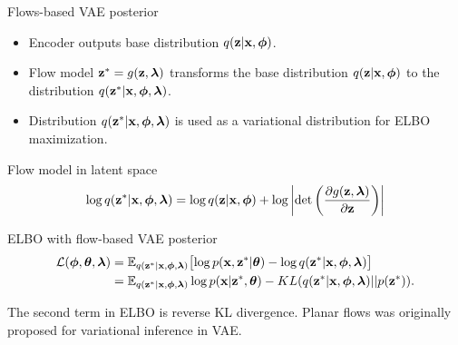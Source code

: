 \begin{frame}{Flows-based VAE posterior}
	\begin{itemize}
		\item Encoder outputs base distribution $q(\mathbf{z} | \mathbf{x}, \boldsymbol{\phi})$.
		\item Flow model $\mathbf{z}^* = g(\mathbf{z}, \boldsymbol{\lambda})$ transforms the base distribution $q(\mathbf{z} | \mathbf{x}, \boldsymbol{\phi})$ to the distribution $q(\mathbf{z}^* | \mathbf{x}, \boldsymbol{\phi}, \boldsymbol{\lambda})$.
		\item Distribution $q(\mathbf{z}^* | \mathbf{x}, \boldsymbol{\phi}, \boldsymbol{\lambda})$ is used as a variational distribution for ELBO maximization.
	\end{itemize}
	
	\begin{block}{Flow model in latent space}
		\vspace{-0.3cm}
		\[
			\log q(\mathbf{z}^* | \mathbf{x}, \boldsymbol{\phi}, \boldsymbol{\lambda}) = \log q(\mathbf{z} | \mathbf{x}, \boldsymbol{\phi}) + \log \left | \det \left( \frac{\partial g(\mathbf{z}, \boldsymbol{\lambda})}{\partial \mathbf{z}}\right) \right|
		\]
		\vspace{-0.3cm}
	\end{block}
	\begin{block}{ELBO with flow-based VAE posterior}
		\vspace{-0.5cm}
		\begin{align*}
			\mathcal{L} (\boldsymbol{\phi}, \boldsymbol{\theta}, \boldsymbol{\lambda})  
			&= \mathbb{E}_{q(\mathbf{z}^* | \mathbf{x}, \boldsymbol{\phi}, \boldsymbol{\lambda})} \bigl[\log p(\mathbf{x}, \mathbf{z}^* | \boldsymbol{\theta}) - \log q(\mathbf{z}^*| \mathbf{x}, \boldsymbol{\phi}, \boldsymbol{\lambda}) \bigr] \\ 
			&=  \mathbb{E}_{q(\mathbf{z}^* | \mathbf{x}, \boldsymbol{\phi}, \boldsymbol{\lambda})} \log p(\mathbf{x} | \mathbf{z}^*, \boldsymbol{\theta}) - KL (q(\mathbf{z}^* | \mathbf{x}, \boldsymbol{\phi}, \boldsymbol{\lambda}) || p(\mathbf{z}^*)).
		\end{align*}
		\vspace{-0.4cm}
	\end{block}
	The second term in ELBO is reverse KL divergence. Planar flows was originally proposed for variational inference in VAE.
	
\end{frame}

